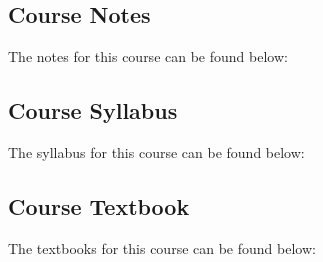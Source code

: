 \subsection{Course Notes}

The notes for this course can be found below: \coursedoc{\CSPBAICourseNotes}

\subsection{Course Syllabus}

The syllabus for this course can be found below: \coursedoc{\CSPBAISyllabus}

\subsection{Course Textbook}

The textbooks for this course can be found below: \coursedoc{\CSPBAITextbook} \coursedoc{\CSPBRLTextbook}